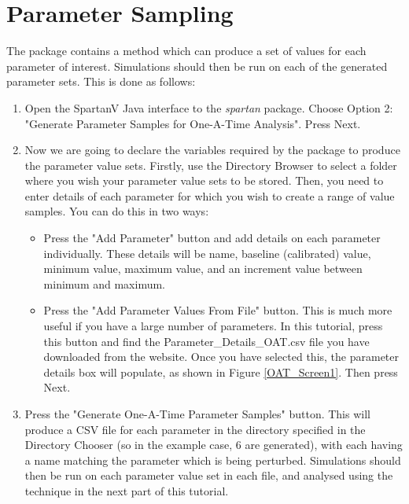 \documentclass[a4paper,11pt]{article}
\begin{document}
\section{Parameter Sampling}
\noindent The package contains a method which can produce a set of values for each parameter of interest. Simulations should then be run on each of the generated parameter sets.  This is done as follows:\\
\begin{enumerate}
\item Open the SpartanV Java interface to the \textit{spartan} package. Choose Option 2: "Generate Parameter Samples for One-A-Time Analysis". Press Next.
\item Now we are going to declare the variables required by the package to produce the parameter value sets. Firstly, use the Directory Browser to select a folder where you wish your parameter value sets to be stored. Then, you need to enter details of each parameter for which you wish to create a range of value samples. You can do this in two ways:
\begin{itemize}
\item Press the "Add Parameter" button and add details on each parameter individually. These details will be name, baseline (calibrated) value, minimum value, maximum value, and an increment value between minimum and maximum.
\item Press the "Add Parameter Values From File" button. This is much more useful if you have a large number of parameters. In this tutorial, press this button and find the Parameter\_Details\_OAT.csv file you have downloaded from the website. Once you have selected this, the parameter details box will populate, as shown in Figure \ref{OAT_Screen1}. Then press Next.
\end{itemize}
\item Press the "Generate One-A-Time Parameter Samples" button. This will produce a CSV file for each parameter in the directory specified in the Directory Chooser (so in the example case, 6 are generated), with each having a name matching the parameter which is being perturbed. Simulations should then be run on each parameter value set in each file, and analysed using the technique in the next part of this tutorial.


\end{enumerate}
\end{document}
